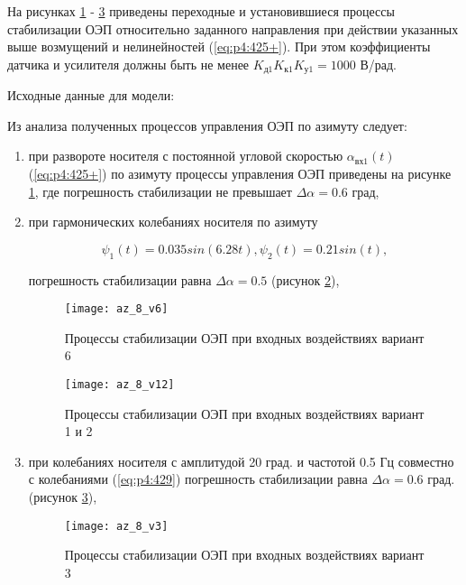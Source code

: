 На рисунках \ref{fig:az31} - \ref{fig:az33} приведены переходные и установившиеся процессы стабилизации ОЭП относительно заданного направления при действии указанных выше возмущений и нелинейностей (\ref{eq:p4:425+}). При этом коэффициенты датчика и усилителя должны быть не менее $K_{\textit{д1}} K_{\textit{к1}} K_{\textit{у1}} = 1000$ В/рад.

Исходные данные для модели:

\begingroup
\captiondelim{ } %

\endgroup

Из анализа полученных процессов управления ОЭП по азимуту следует:

\begin{enumerate}
	\item при развороте носителя с постоянной угловой скоростью  $\alpha_{\textit{вх1}}(t)$ (\ref{eq:p4:425+}) по азимуту процессы управления ОЭП приведены на рисунке \ref{fig:az31}, где погрешность стабилизации не превышает  $\varDelta\alpha=0.6$ град,
	\item при гармонических колебаниях носителя по азимуту
	
	\begin{equation}
	\label{eq:p4:429}
	\psi_{1}(t)=0.035sin(6.28t),\psi_{2}(t)=0.21sin(t),
	\end{equation}
	
	погрешность стабилизации равна $\varDelta\alpha=0.5$ (рисунок \ref{fig:az32}),
	
	\begin{figure}[ht]
		\centering
		\texttt{[image: az\_8\_v6]} 
		\caption{Процессы стабилизации ОЭП при входных воздействиях  вариант 6}
		\label{fig:az31}
	\end{figure} 
		
	\begin{figure}[ht]
		\centering
		\texttt{[image: az\_8\_v12]} 
		\caption{Процессы стабилизации ОЭП при входных воздействиях  вариант 1 и 2}
		\label{fig:az32}
	\end{figure} 

	
	\item при колебаниях носителя с амплитудой 20 град. и частотой 0.5 Гц  совместно с колебаниями (\ref{eq:p4:429}) погрешность стабилизации равна   $\varDelta\alpha=0.6$ град. (рисунок \ref{fig:az33}),
	
	\begin{figure}[ht]
		\centering
		\texttt{[image: az\_8\_v3]} 
		\caption{Процессы стабилизации ОЭП при входных воздействиях  вариант 3}
		\label{fig:az33}
	\end{figure}
 

\end{enumerate}
